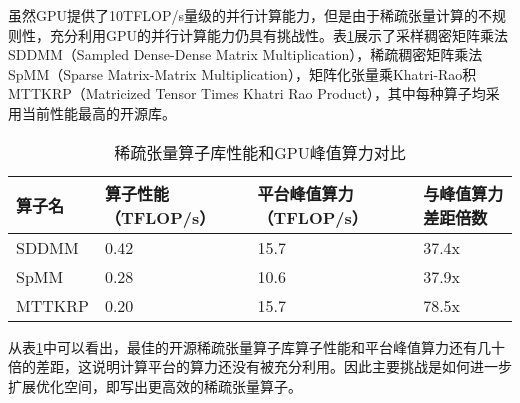 虽然GPU提供了10TFLOP/s量级的并行计算能力，但是由于稀疏张量计算的不规则性，充分利用GPU的并行计算能力仍具有挑战性。表\ref{tab:motivation-1}展示了采样稠密矩阵乘法SDDMM（Sampled Dense-Dense Matrix Multiplication）\cite{yu2021exploiting}，稀疏稠密矩阵乘法SpMM（Sparse Matrix-Matrix Multiplication）\cite{huang2020ge}，矩阵化张量乘Khatri-Rao积MTTKRP（Matricized Tensor Times Khatri Rao Product）\cite{nisa2019mttkrp}，其中每种算子均采用当前性能最高的开源库。
\begin{table}
  \centering
  \caption{稀疏张量算子库性能和GPU峰值算力对比}
  \begin{tabular}{llll}
    \toprule
    算子名  & 算子性能（TFLOP/s） & 平台峰值算力（TFLOP/s） & 与峰值算力差距倍数   \\
    \midrule
    SDDMM  & 0.42 & 15.7 & 37.4x \\
    SpMM   & 0.28 & 10.6 & 37.9x \\
    MTTKRP & 0.20 & 15.7 & 78.5x \\
    \bottomrule
  \end{tabular}
  \label{tab:motivation-1}
\end{table}
从表\ref{tab:motivation-1}中可以看出，最佳的开源稀疏张量算子库算子性能和平台峰值算力还有几十倍的差距，这说明计算平台的算力还没有被充分利用。因此主要挑战是如何进一步扩展优化空间，即写出更高效的稀疏张量算子。

